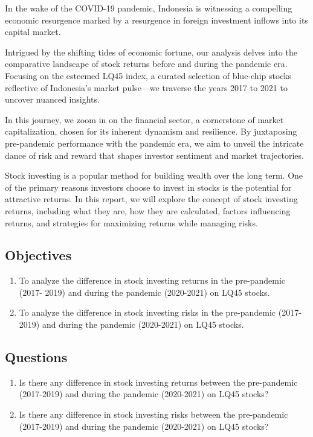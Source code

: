 
\par

In the wake of the COVID-19 pandemic, Indonesia is witnessing a compelling economic resurgence marked by a resurgence in foreign investment inflows into its capital market.

Intrigued by the shifting tides of economic fortune, our analysis delves into the comparative landscape of stock returns before and during the pandemic era. Focusing on the esteemed LQ45 index, a curated selection of blue-chip stocks reflective of Indonesia's market pulse—we traverse the years 2017 to 2021 to uncover nuanced insights.

In this journey, we zoom in on the financial sector, a cornerstone of market capitalization, chosen for its inherent dynamism and resilience. By juxtaposing pre-pandemic performance with the pandemic era, we aim to unveil the intricate dance of risk and reward that shapes investor sentiment and market trajectories.

Stock investing is a popular method for building wealth over the long term. One of the primary reasons investors choose to invest in stocks is the potential for attractive returns. In this report, we will explore the concept of stock investing returns, including what they are, how they are calculated, factors influencing returns, and strategies for maximizing returns while managing risks.

\subsection{Objectives}
\begin{enumerate}
    \item To analyze the difference in stock investing returns in the pre-pandemic (2017-
2019) and during the pandemic (2020-2021) on LQ45 stocks.
    \item To analyze the difference in stock investing risks in the pre-pandemic (2017-
2019) and during the pandemic (2020-2021) on LQ45 stocks.
\end{enumerate}


\subsection{Questions}
\begin{enumerate}
    \item Is there any difference in stock investing returns between the pre-pandemic
(2017-2019) and during the pandemic (2020-2021) on LQ45 stocks?
    \item Is there any difference in stock investing risks between the pre-pandemic
(2017-2019) and during the pandemic (2020-2021) on LQ45 stocks?
\end{enumerate}




